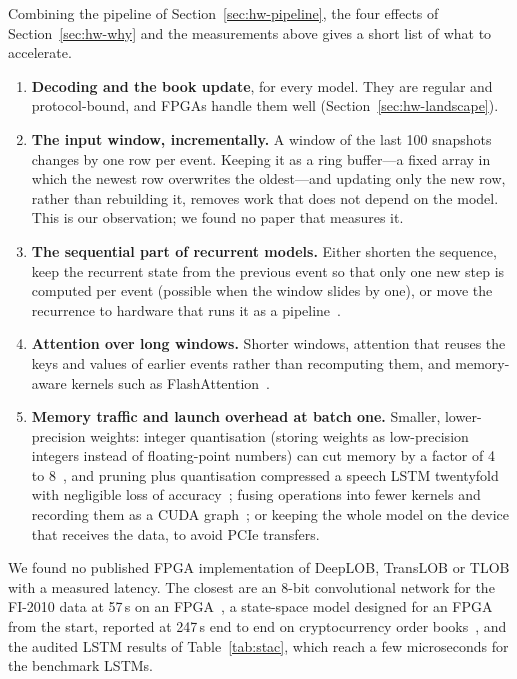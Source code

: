 Combining the pipeline of Section~\ref{sec:hw-pipeline}, the four effects of Section~\ref{sec:hw-why} and the
measurements above gives a short list of what to accelerate.
\begin{enumerate}[leftmargin=1.8em,itemsep=2pt]
\item \textbf{Decoding and the book update}, for every model. They are regular and protocol-bound, and FPGAs handle
  them well (Section~\ref{sec:hw-landscape}).
\item \textbf{The input window, incrementally.} A window of the last 100 snapshots changes by one row per event.
  Keeping it as a ring buffer---a fixed array in which the newest row overwrites the oldest---and updating only the
  new row, rather than rebuilding it, removes work that does not
  depend on the model. This is our observation; we found no paper that measures it.
\item \textbf{The sequential part of recurrent models.} Either shorten the sequence, keep the recurrent state from
  the previous event so that only one new step is computed per event (possible when the window slides by one), or
  move the recurrence to hardware that runs it as a pipeline~\citep{khoda2023rnn}.
\item \textbf{Attention over long windows.} Shorter windows, attention that reuses the keys and values of earlier
  events rather than recomputing them, and memory-aware kernels such as FlashAttention~\citep{dao2022flashattention}.
\item \textbf{Memory traffic and launch overhead at batch one.} Smaller, lower-precision weights: integer
  quantisation (storing weights as low-precision integers instead of floating-point numbers) can cut memory by a factor of 4 to 8~\citep{gholami2022quant,jacob2018}, and
  pruning plus quantisation compressed a speech LSTM twentyfold with negligible loss of accuracy~\citep{han2017ese}; fusing
  operations into fewer kernels and recording them as a CUDA graph~\citep{nvidia_cudagraphs_blog}; or keeping the whole
  model on the device that receives the data, to avoid PCIe transfers.
\end{enumerate}
We found no published FPGA implementation of DeepLOB, TransLOB or TLOB with a measured latency. The closest are an
8-bit convolutional network for the FI-2010 data at 57\,\textmu s on an FPGA~\citep{liu2026microsecond}, a state-space
model designed for an FPGA from the start, reported at 247\,\textmu s end to end on cryptocurrency order
books~\citep{popov2026ssm}, and the audited LSTM results of Table~\ref{tab:stac}, which reach a few microseconds
for the benchmark LSTMs.

